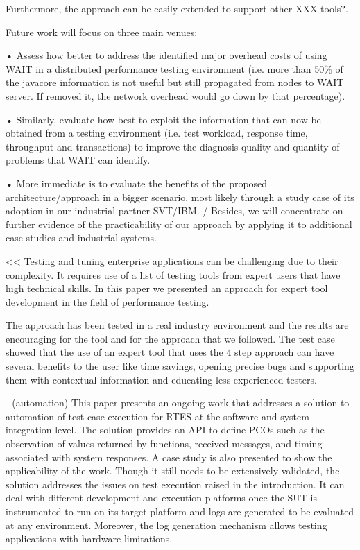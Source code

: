 \documentclass[runningheads,a4paper]{llncs}
\begin{document}
Furthermore, the approach can be easily extended to support other XXX tools?.

Future work will focus on three main venues:

• Assess how better to address the identified major overhead costs of using WAIT
in a distributed performance testing environment (i.e. more than 50\% of the
javacore information is not useful but still propagated from nodes to WAIT server. 
If removed it, the network overhead would go down by that percentage).

• Similarly, evaluate how best to exploit the information that can now be
obtained from a testing environment (i.e. test workload, response time, throughput and 
transactions) to improve the diagnosis quality and quantity of problems that WAIT can 
identify.

• More immediate is to evaluate the benefits of the proposed
architecture/approach in a bigger scenario, most likely through a study case of its 
adoption in our industrial partner SVT/IBM. 
/ 
Besides, we will concentrate on
further evidence of the practicability of our approach by applying it to additional case studies and industrial systems.

<<
Testing and tuning enterprise applications can be
challenging due to their complexity. It requires use of a list of testing tools from expert users that have high technical skills. 
In this paper we presented an approach for expert tool
development in the field of performance testing. 

The approach has been tested in a real industry environment and the results are encouraging for the tool and for the approach that we followed. 
The test case showed that the use of an expert tool that uses the 4 step approach can have several benefits to the user like time savings, opening 
precise bugs and supporting them with contextual information and educating less
experienced testers.

- (automation) This paper presents an ongoing work that addresses a solution to automation of
test case execution for RTES at the software and system integration level. The solution
provides an API to define PCOs such as the observation of values returned by functions, 
received messages, and timing associated with system responses.
A case study is also presented to show the applicability of the work. Though it
still needs to be extensively validated, the solution addresses the issues on test
execution raised in the introduction. It can deal with different development and
execution platforms once the SUT is instrumented to run on its target platform
and logs are generated to be evaluated at any environment. Moreover, the log
generation mechanism allows testing applications with hardware limitations.
\end{document}
